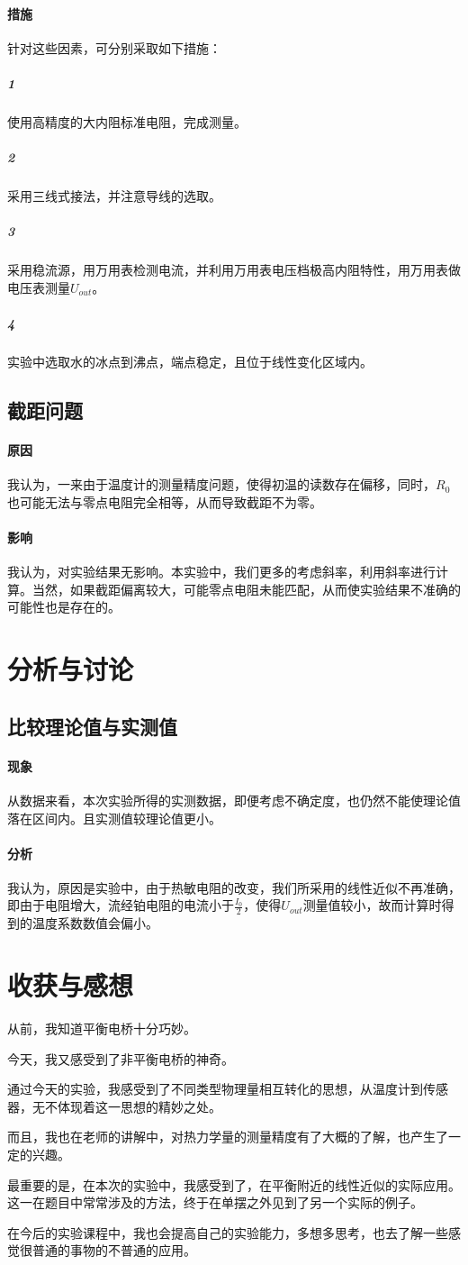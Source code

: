 \documentclass{ctexart}
\begin{document}
\paragraph{措施}针对这些因素，可分别采取如下措施：
\subparagraph{1}使用高精度的大内阻标准电阻，完成测量。
\subparagraph{2}采用三线式接法，并注意导线的选取。
\subparagraph{3}采用稳流源，用万用表检测电流，并利用万用表电压档极高内阻特性，用万用表做电压表测量$U_{out}$。
\subparagraph{4}实验中选取水的冰点到沸点，端点稳定，且位于线性变化区域内。
\subsection{截距问题}
\paragraph{原因}我认为，一来由于温度计的测量精度问题，使得初温的读数存在偏移，同时，$R_0$也可能无法与零点电阻完全相等，从而导致截距不为零。
\paragraph{影响}我认为，对实验结果无影响。本实验中，我们更多的考虑斜率，利用斜率进行计算。当然，如果截距偏离较大，可能零点电阻未能匹配，从而使实验结果不准确的可能性也是存在的。
\section{分析与讨论}
\subsection{比较理论值与实测值}
\paragraph{现象}从数据来看，本次实验所得的实测数据，即便考虑不确定度，也仍然不能使理论值落在区间内。且实测值较理论值更小。

\paragraph{分析}我认为，原因是实验中，由于热敏电阻的改变，我们所采用的线性近似不再准确，即由于电阻增大，流经铂电阻的电流小于$\frac{I_0}{2}$，使得$U_{out}$测量值较小，故而计算时得到的温度系数数值会偏小。



\section{收获与感想}
从前，我知道平衡电桥十分巧妙。

今天，我又感受到了非平衡电桥的神奇。

通过今天的实验，我感受到了不同类型物理量相互转化的思想，从温度计到传感器，无不体现着这一思想的精妙之处。

而且，我也在老师的讲解中，对热力学量的测量精度有了大概的了解，也产生了一定的兴趣。

最重要的是，在本次的实验中，我感受到了，在平衡附近的线性近似的实际应用。这一在题目中常常涉及的方法，终于在单摆之外见到了另一个实际的例子。

在今后的实验课程中，我也会提高自己的实验能力，多想多思考，也去了解一些感觉很普通的事物的不普通的应用。
\end{document}
